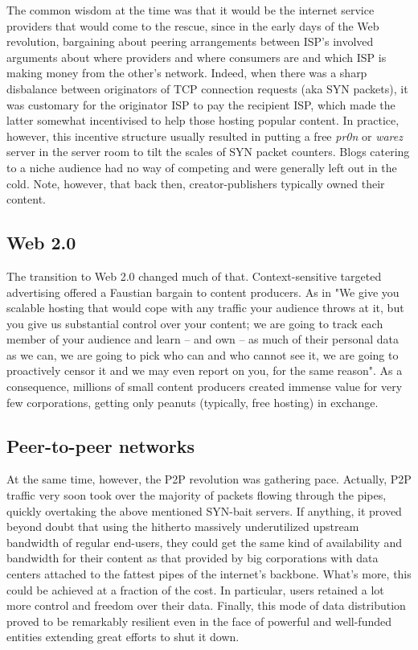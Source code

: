 The common wisdom at the time was that it would be the internet service providers that would come to the rescue, since in the early days of the Web revolution, bargaining about peering arrangements between ISP's involved arguments about where providers and where consumers are and which ISP is making money from the other's network. Indeed, when there was a sharp disbalance between originators of TCP connection requests (aka SYN packets), it was customary for the originator ISP to pay the recipient ISP, which made the latter somewhat incentivised to help those hosting popular content. In practice, however, this incentive structure usually resulted in putting a free \emph{pr0n} or \emph{warez} server in the server room to tilt the scales of SYN packet counters. Blogs catering to a niche audience had no way of competing and were generally left out in the cold. Note, however, that back then, creator-publishers typically owned their content.

\subsection{Web 2.0}\label{sec:web_2}

The transition to Web 2.0 changed much of that. Context-sensitive targeted advertising offered a Faustian bargain to content producers. As in "We give you scalable hosting that would cope with any traffic your audience throws at it, but you give us substantial control over your content; we are going to track each member of your audience and learn -- and own -- as much of their personal data as we can, we are going to pick who can and who cannot see it, we are going to proactively censor it and we may even report on you, for the same reason". As a consequence, millions of small content producers created immense value for very few corporations, getting only peanuts (typically, free hosting) in exchange.

\subsection{Peer-to-peer networks}\label{sec:peer_to_peer}

At the same time, however, the P2P revolution was gathering pace. Actually, P2P traffic very soon took over the majority of packets flowing through the pipes, quickly overtaking the above mentioned SYN-bait servers. If anything, it proved beyond doubt that using the hitherto massively underutilized upstream bandwidth of regular end-users, they could get the same kind of availability and bandwidth for their content as that provided by big corporations with data centers attached to the fattest pipes of the internet's backbone. What's more, this could be achieved at a fraction of the cost. In particular, users retained a lot more control and freedom over their data. Finally, this mode of data distribution proved to be remarkably resilient even in the face of powerful and well-funded entities extending great efforts to shut it down.


